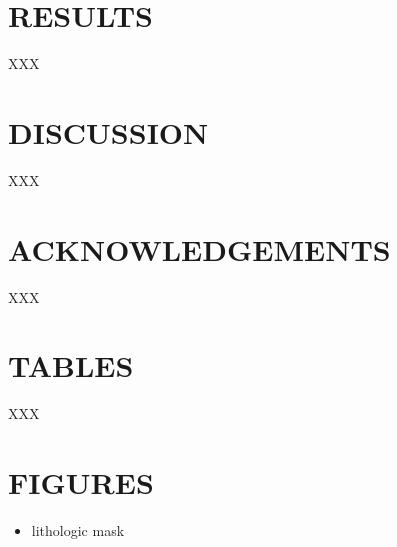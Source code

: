 \documentclass[11pt,letterpaper]{article}
\begin{document}
\section*{RESULTS}

XXX

\section*{DISCUSSION}

XXX

\section*{ACKNOWLEDGEMENTS \label{sec:ACKNOWLEDGEMENTS}}

XXX

\clearpage
\newpage

\section*{TABLES}

XXX

\clearpage
\newpage

\section*{FIGURES}

\begin{itemize}
    \item lithologic mask
\end{itemize}

\clearpage
\newpage
\footnotesize

\singlespacing



\end{document}
